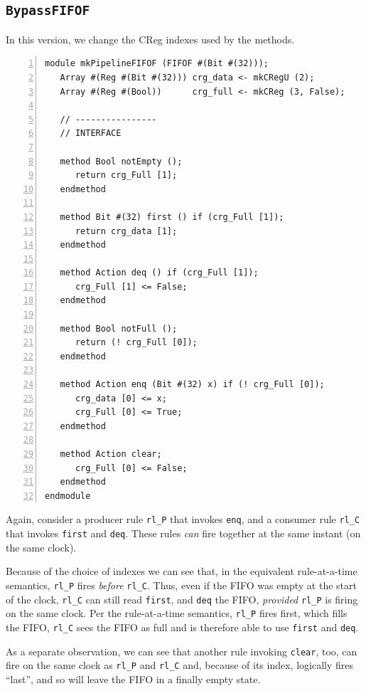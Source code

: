 
\subsection{{\tt BypassFIFOF}}

In this version, we change the CReg indexes used by the methods.

{\small
\begin{Verbatim}[frame=single, numbers=left]
module mkPipelineFIFOF (FIFOF #(Bit #(32)));
   Array #(Reg #(Bit #(32))) crg_data <- mkCRegU (2);
   Array #(Reg #(Bool))      crg_full <- mkCReg (3, False);

   // ----------------
   // INTERFACE

   method Bool notEmpty ();
      return crg_Full [1];
   endmethod

   method Bit #(32) first () if (crg_Full [1]);
      return crg_data [1];
   endmethod

   method Action deq () if (crg_Full [1]);
      crg_Full [1] <= False;
   endmethod

   method Bool notFull ();
      return (! crg_Full [0]);
   endmethod

   method Action enq (Bit #(32) x) if (! crg_Full [0]);
      crg_data [0] <= x;
      crg_Full [0] <= True;
   endmethod

   method Action clear;
      crg_Full [0] <= False;
   endmethod
endmodule
\end{Verbatim}
}

Again, consider a producer rule \verb|rl_P| that invokes \verb|enq|,
and a consumer rule \verb|rl_C| that invokes \verb|first| and
\verb|deq|.  These rules \emph{can} fire together at the same instant
(on the same clock).

Because of the choice of indexes we can see that, in the equivalent
rule-at-a-time semantics, \verb|rl_P| fires \emph{before} \verb|rl_C|.
Thus, even if the FIFO was empty at the start of the clock,
\verb|rl_C| can still read \verb|first|, and \verb|deq| the FIFO,
\emph{provided} \verb|rl_P| is firing on the same clock.  Per the
rule-at-a-time semantics, \verb|rl_P| fires first, which fills the
FIFO, {\ie} \verb|rl_C| sees the FIFO as full and is therefore able to
use \verb|first| and \verb|deq|.

As a separate observation, we can see that another rule invoking
\verb|clear|, too, can fire on the same clock as \verb|rl_P| and
\verb|rl_C| and, because of its index, logically fires ``last'', and
so will leave the FIFO in a finally empty state.

